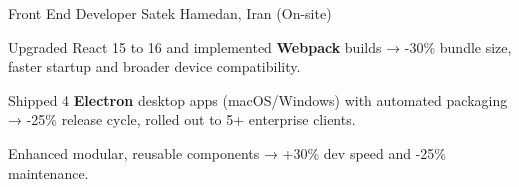 \begin{cventries}
  \cventry
  {Front End Developer} %
  {Satek} %
  {Hamedan, Iran (On-site)} %
  {} %
  {
    \begin{cvitems} %
      \item {Upgraded React 15 to 16 and implemented \textbf{Webpack} builds → -30\% bundle size, faster startup and broader device compatibility.}
      \item {Shipped 4 \textbf{Electron} desktop apps (macOS/Windows) with automated packaging → -25\% release cycle, rolled out to 5+ enterprise clients.}
      \item {Enhanced modular, reusable components → +30\% dev speed and -25\% maintenance.}
    \end{cvitems}
  }
\end{cventries}
